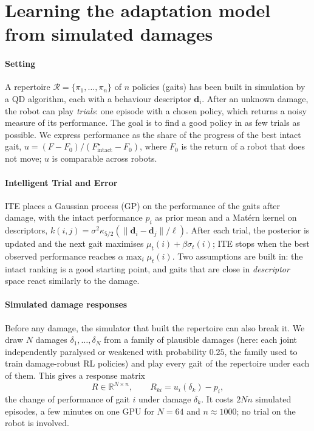 \section{Learning the adaptation model from simulated damages}\label{sec:method}

\paragraph{Setting} A repertoire $\mathcal{R}=\{\pi_1,\dots,\pi_n\}$ of $n$ policies (gaits) has been built in
simulation by a QD algorithm, each with a behaviour descriptor $\mathbf{d}_i$. After an unknown damage, the robot can
play \emph{trials}: one episode with a chosen policy, which returns a noisy measure of its performance. The goal is to
find a good policy in as few trials as possible. We express performance as the share of the progress of the best intact
gait, $u = (F - F_0)/(F^\star_{\text{intact}} - F_0)$, where $F_0$ is the return of a robot that does not move; $u$ is
comparable across robots.

\paragraph{Intelligent Trial and Error} ITE \cite{cully2015robots} places a Gaussian process (GP) on the performance of
the gaits after damage, with the intact performance $p_i$ as prior mean and a Mat\'ern kernel on descriptors,
$k(i,j)=\sigma^2 \kappa_{5/2}(\lVert\mathbf{d}_i-\mathbf{d}_j\rVert/\ell)$. After each trial, the posterior is updated
and the next gait maximises $\mu_t(i)+\beta\sigma_t(i)$; ITE stops when the best observed performance reaches
$\alpha \max_i \mu_t(i)$. Two assumptions are built in: the intact ranking is a good starting point, and gaits that are
close in \emph{descriptor} space react similarly to the damage.

\paragraph{Simulated damage responses} Before any damage, the simulator that built the repertoire can also break it.
We draw $N$ damages $\delta_1,\dots,\delta_N$ from a family of plausible damages (here: each joint independently
paralysed or weakened with probability $0.25$, the family used to train damage-robust RL policies) and play every gait
of the repertoire under each of them. This gives a response matrix
\[
  R \in \mathbb{R}^{N\times n}, \qquad R_{ki} = u_i(\delta_k) - p_i ,
\]
the change of performance of gait $i$ under damage $\delta_k$. It costs $2Nn$ simulated episodes, a few minutes on one
GPU for $N=64$ and $n\approx 1000$; no trial on the robot is involved.

